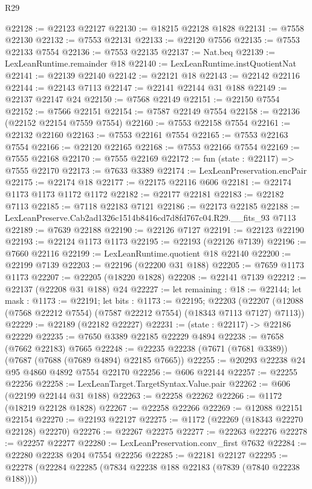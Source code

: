 \begin{lexlean}{R29}
\begin{coremodule}
@22128 := @22123 @22127
@22130 := @18215 @22128 @1828
@22131 := @7558 @22130
@22132 := @7553 @22131
@22133 := @22120 @7556
@22135 := @7553 @22133 @7554
@22136 := @7553 @22135
@22137 := Nat.beq
@22139 := LexLeanRuntime.remainder @18
@22140 := LexLeanRuntime.instQuotientNat
@22141 := @22139 @22140
@22142 := @22121 @18
@22143 := @22142 @22116
@22144 := @22143 @7113
@22147 := @22141 @22144 @31 @188
@22149 := @22137 @22147 @24
@22150 := @7568 @22149
@22151 := @22150 @7554
@22152 := @7566 @22151
@22154 := @7587 @22149 @7554
@22158 := @22136 (@22152 @22154 @7559 @7554)
@22160 := @7553 @22158 @7554
@22161 := @22132 @22160
@22163 := @7553 @22161 @7554
@22165 := @7553 @22163 @7554
@22166 := @22120 @22165
@22168 := @7553 @22166 @7554
@22169 := @7555 @22168
@22170 := @7555 @22169
@22172 := fun (state : @22117) => @7555 @22170
@22173 := @7633 @3389
@22174 := LexLeanPreservation.encPair
@22175 := @22174 @18
@22177 := @22175 @22116 @606
@22181 := @22174 @1173 @1173 @1172 @1172
@22182 := @22177 @22181
@22183 := @22182 @7113
@22185 := @7118 @22183 @7121
@22186 := @22173 @22185
@22188 := LexLeanPreserve.Cab2ad1326c1514b8416cd7d8fd767c04.R29.__fits_93 @7113
@22189 := @7639 @22188
@22190 := @22126 @7127
@22191 := @22123 @22190
@22193 := @22124 @1173 @1173
@22195 := @22193 (@22126 @7139)
@22196 := @7660 @22116
@22199 := LexLeanRuntime.quotient @18 @22140
@22200 := @22199 @7139
@22203 := @22196 (@22200 @31 @188)
@22205 := @7659 @1173 @1173
@22207 := @22205 (@18220 @1828)
@22208 := @22141 @7139
@22212 := @22137 (@22208 @31 @188) @24
@22227 := let remaining : @18 := @22144;
  let mask : @1173 := @22191;
  let bits : @1173 := @22195;
  @22203 (@22207 (@12088 (@7568 @22212 @7554) (@7587 @22212 @7554) (@18343 @7113 @7127) @7113))
@22229 := @22189 (@22182 @22227)
@22231 := (state : @22117) -> @22186 @22229
@22235 := @7650 @3389 @22185 @22229 @4894
@22238 := @7658 (@7662 @22183) @7665
@22248 := @22235 @22238 (@7671 (@7681 @3389)) (@7687 (@7688 (@7689 @4894) @22185 @7665))
@22255 := @20293 @22238 @24 @95 @4860 @4892 @7554 @22170
@22256 := @606 @22144
@22257 := @22255 @22256
@22258 := LexLeanTarget.TargetSyntax.Value.pair
@22262 := @606 (@22199 @22144 @31 @188)
@22263 := @22258 @22262
@22266 := @1172 (@18219 @22128 @1828)
@22267 := @22258 @22266
@22269 := @12088 @22151 @22154
@22270 := @22193 @22127
@22275 := @1172 (@22269 (@18343 @22270 @22128) @22270)
@22276 := @22267 @22275
@22277 := @22263 @22276
@22278 := @22257 @22277
@22280 := LexLeanPreservation.conv_first @7632
@22284 := @22280 @22238 @204 @7554 @22256
@22285 := @22181 @22127
@22295 := @22278 (@22284 @22285 (@7834 @22238 @188 @22183 (@7839 (@7840 @22238 @188))))

\end{coremodule}
\end{lexlean}
